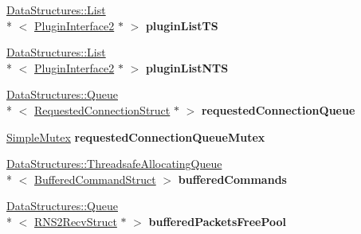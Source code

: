 \begin{DoxyCompactItemize}
\item 
\hypertarget{class_rak_net_1_1_rak_peer_a36dfa8b16cde59a1a8a05dc77269e7f2}{\hyperlink{class_data_structures_1_1_list}{Data\-Structures\-::\-List}\\*
$<$ \hyperlink{class_rak_net_1_1_plugin_interface2}{Plugin\-Interface2} $\ast$ $>$ {\bfseries plugin\-List\-T\-S}}\label{class_rak_net_1_1_rak_peer_a36dfa8b16cde59a1a8a05dc77269e7f2}

\item 
\hypertarget{class_rak_net_1_1_rak_peer_a9531d246ea38434ccb41bc197abffb32}{\hyperlink{class_data_structures_1_1_list}{Data\-Structures\-::\-List}\\*
$<$ \hyperlink{class_rak_net_1_1_plugin_interface2}{Plugin\-Interface2} $\ast$ $>$ {\bfseries plugin\-List\-N\-T\-S}}\label{class_rak_net_1_1_rak_peer_a9531d246ea38434ccb41bc197abffb32}

\item 
\hypertarget{class_rak_net_1_1_rak_peer_ad0926bbf4370ab69cc486e9b34b57596}{\hyperlink{class_data_structures_1_1_queue}{Data\-Structures\-::\-Queue}\\*
$<$ \hyperlink{struct_rak_net_1_1_rak_peer_1_1_requested_connection_struct}{Requested\-Connection\-Struct} $\ast$ $>$ {\bfseries requested\-Connection\-Queue}}\label{class_rak_net_1_1_rak_peer_ad0926bbf4370ab69cc486e9b34b57596}

\item 
\hypertarget{class_rak_net_1_1_rak_peer_a331a559c527957020ab54eabf9545923}{\hyperlink{class_rak_net_1_1_simple_mutex}{Simple\-Mutex} {\bfseries requested\-Connection\-Queue\-Mutex}}\label{class_rak_net_1_1_rak_peer_a331a559c527957020ab54eabf9545923}

\item 
\hypertarget{class_rak_net_1_1_rak_peer_a2f69e80aa00215bbbb13a8043a7ea915}{\hyperlink{class_data_structures_1_1_threadsafe_allocating_queue}{Data\-Structures\-::\-Threadsafe\-Allocating\-Queue}\\*
$<$ \hyperlink{struct_rak_net_1_1_rak_peer_1_1_buffered_command_struct}{Buffered\-Command\-Struct} $>$ {\bfseries buffered\-Commands}}\label{class_rak_net_1_1_rak_peer_a2f69e80aa00215bbbb13a8043a7ea915}

\item 
\hypertarget{class_rak_net_1_1_rak_peer_a005743ce85331b1eda015ea4f1a05a62}{\hyperlink{class_data_structures_1_1_queue}{Data\-Structures\-::\-Queue}\\*
$<$ \hyperlink{struct_rak_net_1_1_r_n_s2_recv_struct}{R\-N\-S2\-Recv\-Struct} $\ast$ $>$ {\bfseries buffered\-Packets\-Free\-Pool}}\label{class_rak_net_1_1_rak_peer_a005743ce85331b1eda015ea4f1a05a62}


\end{DoxyCompactItemize}
